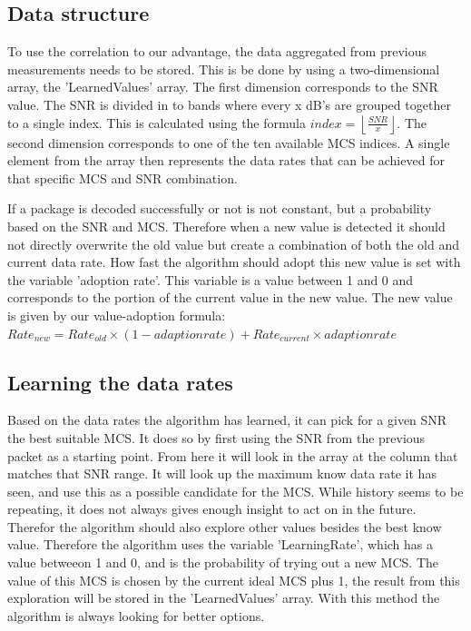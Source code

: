 \documentclass[conference,compsoc]{IEEEtran}
\begin{document}
\subsection{Data structure}
To use the correlation to our advantage, the data aggregated from previous measurements needs to be stored. This is be done by using a two-dimensional array, the 'LearnedValues' array. The first dimension corresponds to the SNR value. The SNR is divided in to bands where every x dB’s are grouped together to a single index. This is calculated using the formula $ index = \left \lfloor{}\frac{SNR}{x}  \right \rfloor$. The second dimension corresponds to one of the ten available MCS indices. A single element from the array then represents the data rates that can be achieved for that specific MCS and SNR combination.

If a package is decoded successfully or not is not constant, but a probability based on the SNR and MCS. Therefore when a new value is detected it should not directly overwrite the old value but create a combination of both the old and current data rate. How fast the algorithm should adopt this new value is set with the variable 'adoption rate'. This variable is a value between 1 and 0 and corresponds to the portion of the current value in the new value. The new value is given by our value-adoption formula: $Rate_{new} = Rate_{old} \times(1-adaption rate) + Rate_{current} \times adaption rate $

\subsection{Learning the data rates}
Based on the data rates the algorithm has learned, it can pick for a given SNR the best suitable MCS. It does so by first using the SNR from the previous packet as a starting point. From here it will look in the array at the column that matches that SNR range. It will look up the maximum know data rate it has seen, and use this as a possible candidate for the MCS. While history seems to be repeating, it does not always gives enough insight to act on in the future. Therefor the algorithm should also explore other values besides the best know value. Therefore the algorithm uses the variable 'LearningRate', which has a value betweeon 1 and 0, and is the probability of trying out a new MCS. The value of this MCS is chosen by the current ideal MCS plus 1, the result from this exploration will be stored in the 'LearnedValues' array. With this method the algorithm is always looking for better options.
\end{document}
